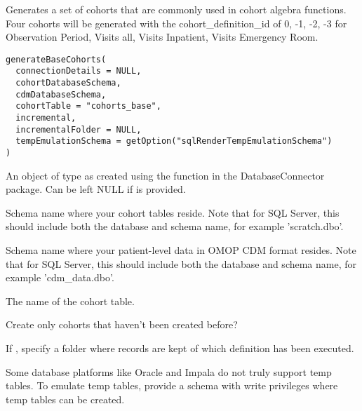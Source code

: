 \documentclass[a4paper]{book}
\begin{document}
%
\begin{Description}\relax
Generates a set of cohorts that are commonly used in cohort algebra functions. Four cohorts will be generated
with the cohort\_definition\_id of 0, -1, -2, -3 for Observation Period, Visits all, Visits Inpatient, Visits Emergency Room.

\strong{[Experimental]}
\end{Description}
%
\begin{Usage}
\begin{verbatim}
generateBaseCohorts(
  connectionDetails = NULL,
  cohortDatabaseSchema,
  cdmDatabaseSchema,
  cohortTable = "cohorts_base",
  incremental,
  incrementalFolder = NULL,
  tempEmulationSchema = getOption("sqlRenderTempEmulationSchema")
)
\end{verbatim}
\end{Usage}
%
\begin{Arguments}
\begin{ldescription}
\item[\code{connectionDetails}] An object of type  as created using the
 function in the
DatabaseConnector package. Can be left NULL if  is
provided.

\item[\code{cohortDatabaseSchema}] Schema name where your cohort tables reside. Note that for SQL Server,
this should include both the database and schema name, for example
'scratch.dbo'.

\item[\code{cdmDatabaseSchema}] Schema name where your patient-level data in OMOP CDM format resides.
Note that for SQL Server, this should include both the database and
schema name, for example 'cdm\_data.dbo'.

\item[\code{cohortTable}] The name of the cohort table.

\item[\code{incremental}] Create only cohorts that haven't been created before?

\item[\code{incrementalFolder}] If , specify a folder where records are
kept of which definition has been executed.

\item[\code{tempEmulationSchema}] Some database platforms like Oracle and Impala do not truly support
temp tables. To emulate temp tables, provide a schema with write
privileges where temp tables can be created.
\end{ldescription}
\end{Arguments}
\end{document}
